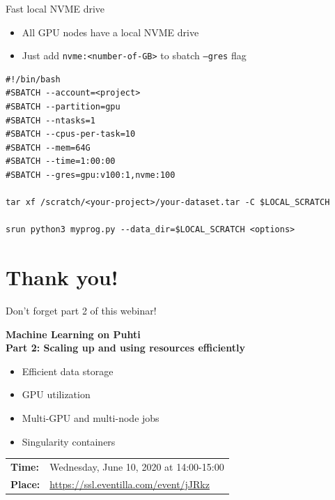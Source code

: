 \documentclass[aspectratio=1610,14pt]{beamer}
\newcommand{\link}[1]{\alert{\url{#1}}}
\begin{document}
\begin{frame}[fragile]{Fast local NVME drive}

  \begin{itemize}
  \item All GPU nodes have a local NVME drive
  \item Just add {\tt nvme:<number-of-GB>} to sbatch {\tt --gres} flag
  \end{itemize}

\begin{verbatim}
#!/bin/bash
#SBATCH --account=<project>
#SBATCH --partition=gpu
#SBATCH --ntasks=1
#SBATCH --cpus-per-task=10
#SBATCH --mem=64G
#SBATCH --time=1:00:00
#SBATCH --gres=gpu:v100:1,nvme:100

tar xf /scratch/<your-project>/your-dataset.tar -C $LOCAL_SCRATCH

srun python3 myprog.py --data_dir=$LOCAL_SCRATCH <options>
\end{verbatim}

\end{frame}

\section*{Thank you!}

\begin{frame}{Don't forget part 2 of this webinar!}

  \textbf{Machine Learning on Puhti \\
    Part 2: Scaling up and using resources efficiently}

  \begin{itemize}
  \item Efficient data storage
  \item GPU utilization
  \item Multi-GPU and multi-node jobs
  \item Singularity containers
  \end{itemize}

  \vfill

  \begin{tabular}{ll}
    \textbf{Time:}  & Wednesday, June 10, 2020 at 14:00-15:00 \\
    \textbf{Place:} & \link{https://ssl.eventilla.com/event/jJRkz} \\
  \end{tabular}

\end{frame}
\end{document}
